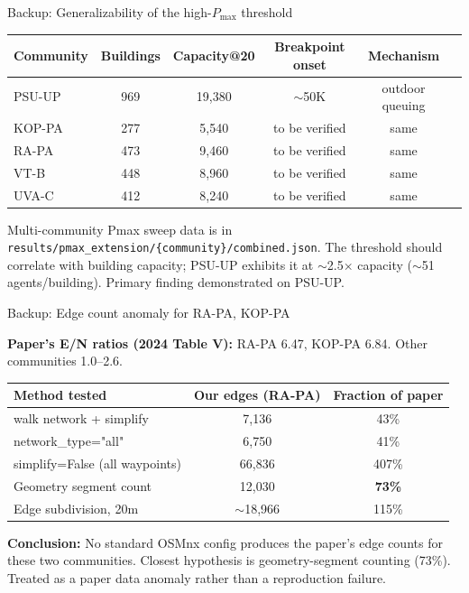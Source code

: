 \documentclass[aspectratio=169, xcolor=table]{beamer}
\begin{document}
\begin{frame}[t]{Backup: Generalizability of the high-$P_{\max}$ threshold}
\footnotesize

\begin{center}
{\scriptsize
\begin{tabular}{lccccc}
\toprule
Community & Buildings & Capacity@20 & Breakpoint onset & Mechanism \\
\midrule
PSU-UP & 969 & 19{,}380 & $\sim$50K & outdoor queuing \\
KOP-PA & 277 & 5{,}540 & to be verified & same \\
RA-PA  & 473 & 9{,}460 & to be verified & same \\
VT-B   & 448 & 8{,}960 & to be verified & same \\
UVA-C  & 412 & 8{,}240 & to be verified & same \\
\bottomrule
\end{tabular}}
\end{center}

\vspace{0.6em}
{\scriptsize Multi-community Pmax sweep data is in \texttt{results/pmax\_extension/\{community\}/combined.json}.
The threshold should correlate with building capacity; PSU-UP exhibits it at $\sim$2.5$\times$ capacity ($\sim$51 agents/building). Primary finding demonstrated on PSU-UP.}
\end{frame}

\begin{frame}[t]{Backup: Edge count anomaly for RA-PA, KOP-PA}
\footnotesize

\textbf{Paper's E/N ratios (2024 Table V):} RA-PA 6.47, KOP-PA 6.84. Other communities 1.0--2.6.

\begin{center}
{\scriptsize
\begin{tabular}{lcc}
\toprule
Method tested & Our edges (RA-PA) & Fraction of paper \\
\midrule
walk network + simplify & 7{,}136 & 43\% \\
network\_type="all" & 6{,}750 & 41\% \\
simplify=False (all waypoints) & 66{,}836 & 407\% \\
Geometry segment count & 12{,}030 & \textbf{73\%} \\
Edge subdivision, 20m & $\sim$18{,}966 & 115\% \\
\bottomrule
\end{tabular}}
\end{center}

\vspace{0.4em}
\textbf{Conclusion:} No standard OSMnx config produces the paper's edge counts for these two communities. Closest hypothesis is geometry-segment counting (73\%). Treated as a paper data anomaly rather than a reproduction failure.
\end{frame}
\end{document}

